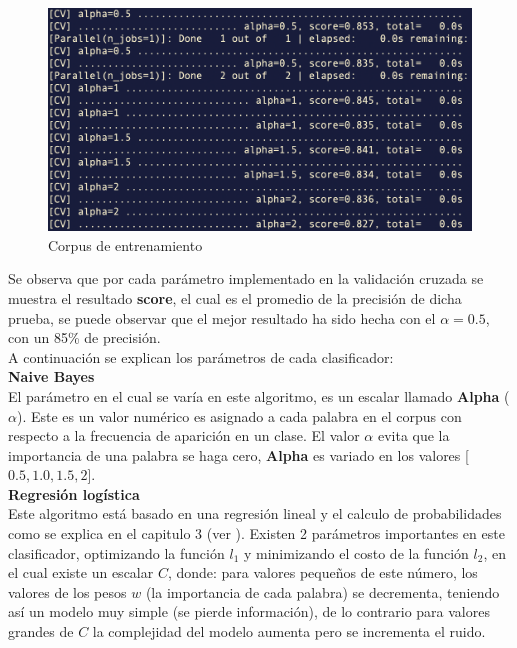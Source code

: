 \begin{figure}[h]
\centering
\includegraphics[scale=.5]{imagenes/capitulo5/Entrenamiento/gridbayes.png}
\caption{Corpus de entrenamiento}
\label{fig:cp5:gridbayes}
\end{figure}

Se observa que por cada parámetro implementado en la validación cruzada se muestra el resultado \textbf{score}, el cual es el promedio de la precisión de dicha prueba, se puede observar que el mejor resultado ha sido hecha con el $\alpha=0.5$, con un 85\% de precisión.\\


A continuación se explican los parámetros de cada clasificador: \\

\textbf{Naive Bayes}\\
 
El parámetro en el cual se varía en este algoritmo, es un escalar llamado \textbf{Alpha} ($\alpha$). Este es un valor numérico es asignado a cada palabra en el corpus con respecto a la frecuencia de aparición en un clase. El valor $\alpha$ evita que la importancia de una palabra se haga cero, \textbf{Alpha} es variado en los valores [$0.5, 1.0, 1.5, 2$].\\


\textbf{Regresión logística}\\

 Este algoritmo está basado en una regresión lineal y el calculo de probabilidades como se explica en el capitulo 3 (ver ). Existen 2  parámetros importantes en este clasificador, optimizando la función $l_1$  y minimizando el costo de la función $l_2$, en el cual existe un escalar $C$, donde: para valores pequeños de este número, los valores de los pesos $w$ (la importancia de cada palabra) se decrementa, teniendo así un modelo muy simple (se pierde información), de lo contrario para valores grandes de $C$ la complejidad del modelo aumenta pero se incrementa el ruido.\\

